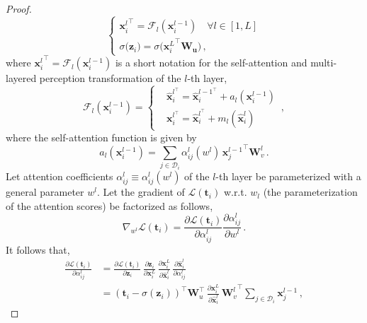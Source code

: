 \begin{proof}
\begin{equation}
\begin{cases}
{\bm{x}_i^l}^\top = \mathcal{F}_l(\bm{x}_i^{l-1})\quad \forall l \in [1, L] \\
\sigma\big(\bm{z}_i\big)  = \sigma\big({\bm{x}_i^L}^\top \bm{W_u}\big)\,,
%
\end{cases}
\label{eq-proof-gradient-bilinear-form-transformer-model}
\end{equation}
%
where ${\bm{x}^l_i}^\top = \mathcal{F}_l(\bm{x}_i^{l-1})$ is a short notation for the self-attention and multi-layered perception transformation of the $l$-th layer,
%
\begin{equation}
\mathcal{F}_l(\bm{x}_i^{l-1}) =
\left\{
\begin{aligned}
& \hat{\bm{x}}_i^{l^{\top}} = \hat{\bm{x}}_i^{{l-1}^{\top}} + a_l(\bm{x}_i^{l-1}) \\
& \bm{x}_i^{l^{\top}} = \hat{\bm{x}}_i^{l^{\top}} + m_l(\hat{\bm{x}}^l_i)
\end{aligned}
\right.\,,
\end{equation}
%
where the self-attention function is given by
%
\begin{equation}
    a_l(\bm{x}_i^{l-1}) = \sum_{j\in \mathcal{D}_i} 
\alpha^l_{ij}(w^l)\,
{\bm{x}^{l-1}_j}^\top \bm{W}^l_v \,.
\end{equation}
%
Let attention coefficients $\alpha^l_{ij} \equiv \alpha^l_{ij} (w^l)$ of the $l$-th layer be parameterized with a general parameter $w^l$.
%
%
Let the gradient of $\mathcal{L}(\bm{t}_i)$ w.r.t. $w_l$ (the parameterization of the attention scores) be factorized as follows,
%
\begin{equation}
    \nabla_{w^l} \mathcal{L}(\bm{t}_i) = \frac{\partial \mathcal{L}(\bm{t}_i)}{\partial \alpha^l_{ij}} \frac{\partial \alpha^l_{ij}}{\partial w^l}\,.
\end{equation}
%
It follows that,
%
\begin{equation}
\begin{split}
    \frac{\partial \mathcal{L}(\bm{t}_i)}{\partial \alpha^l_{ij}} 
    & = \frac{\partial \mathcal{L}(\bm{t}_i)}{\partial \bm{z}_i} \, \frac{\partial \bm{z}_i}{\partial \bm{x}^L_i} \, \frac{\partial \bm{x}^L_i}{\partial \hat{\bm{x}}^l_i}\,\frac{\partial \hat{\bm{x}}^l_i} {\partial \alpha^l_{ij}} 
    \\
    & = (\bm{t}_i - \sigma(\bm{z}_i))^\top \bm{W}_u^\top \, \frac{\partial \bm{x}^L_i}{\partial \hat{\bm{x}}^l_i}\,{\bm{W}^l_v}^\top \sum_{j\in \mathcal{D}_i} \bm{x}^{l-1}_j \,,
\end{split}

\end{equation}
\end{proof}
